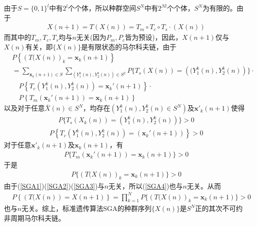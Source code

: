         \begin{Proof}
        由于$S={\{0,1\}}^l$中有$2^l$个个体，所以种群空间$S^N$中有$2^{Nl}$个个体，$S^N$为有限的。由于
        \begin{align*}
        X(n+1)=T\left(X(n)\right)=T_m\circ T_c \circ T_s\cdot \left(X(n)\right)
        \end{align*}
        而其中的$T_m,T_c,T_s$均与$n$无关(因为$P_m,P_c$皆为预设)，因此，$X(n+1)$仅与$X(n)$有关，即$\{X(n)\}$是有限状态的马尔科夫链，由于
        \begin{align*}
        &P\left\{{\left(T(X(n)\right)}_k=\mathbf{x}_k(n+1)\right\}\\
        &={\mathop{\sum}\limits_{\mathbf{x}_k(n+1)\in S}}{\mathop{\sum}\limits_{(Y_1^k(n),Y_2^k(n))\in S^2}}P\{T_s\left(X(n)\right)=\left((Y_1^k(n),Y_2^k(n)\right)\}\cdot{}\\
        &\quad P\left\{T_c\left(Y_1^k(n),Y_2^k(n)\right)=\mathbf{x}_k'(n+1)\right\}\cdot{} \\
        & \quad P\left\{T_m\left(\mathbf{x}_k'(n+1)\right)=\mathbf{x}_k(n+1)\right\}
        \end{align*}
        以及对于任意${\bar{X}}(n)\in S^N$，均存在$(Y_1^k(n),Y_2^k(n)\in S^N)$及$\mathbf{x}'_k(n+1)$使得
        \begin{align}
        \label{SGA1}
        P\{T_s(X_k(n))=(Y_1^k(n),Y_2^k(n))\}>0
        \end{align}
        \begin{align}
        \label{SGA2}
        P\left\{T_c\left(Y_1^k(n),Y_2^k(n)\right)=\left(\mathbf{x}_k'(n+1)\right)\right\}>0
        \end{align}
        对于任意$\mathbf{x}'_k(n+1)$及$\mathbf{x}_k(n+1)$，有
        \begin{align}
        \label{SGA3}
         P\{T_m(\mathbf{x}_k'(n+1))=\mathbf{x}_k(n+1)\}>0
        \end{align}
        于是
        \begin{align}
        \label{SGA4}
        P\{\left(T(X(n)\right)_k=\mathbf{x}_k(n+1)\}>0
        \end{align}
        由于(\ref{SGA1})(\ref{SGA2})(\ref{SGA3})与$n$无关，所以(\ref{SGA4})也与$n$无关。从而
        \begin{align*}
        & P\left\{\left(T(X(n)\right)=X(n+1)\right\}=\mathop{\prod}\limits_{k=1}^NP\{\left(T(X(n)\right)_k=\mathbf{x}_k(n+1)\}>0
        \end{align*}
        也与$n$无关。综上，标准遗传算法SGA的种群序列$\{X(n)\}$是$S^N$正的其次不可约非周期马尔科夫链。
        \end{Proof}
